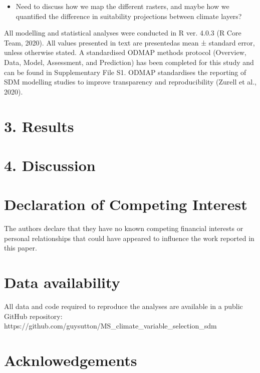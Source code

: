 \documentclass[
  authoryear,
  preprint,
  3p,
  twocolumn]{elsarticle}
\providecommand{\tightlist}{%
  \setlength{\itemsep}{0pt}\setlength{\parskip}{0pt}}\usepackage{longtable,booktabs,array}
\begin{document}
\begin{itemize}
\tightlist
\item
  Need to discuss how we map the different rasters, and maybe how we
  quantified the difference in suitability projections between climate
  layers?
\end{itemize}

All modelling and statistical analyses were conducted in R ver. 4.0.3 (R
Core Team, 2020). All values presented in text are presentedas mean ±
standard error, unless otherwise stated. A standardised ODMAP methods
protocol (Overview, Data, Model, Assessment, and Prediction) has been
completed for this study and can be found in Supplementary File S1.
ODMAP standardises the reporting of SDM modelling studies to improve
transparency and reproducibility (Zurell et al., 2020).

\hypertarget{results}{%
\section{3. Results}\label{results}}

\hypertarget{discussion}{%
\section{4. Discussion}\label{discussion}}

\hypertarget{declaration-of-competing-interest}{%
\section{Declaration of Competing
Interest}\label{declaration-of-competing-interest}}

The authors declare that they have no known competing financial
interests or personal relationships that could have appeared to
influence the work reported in this paper.

\hypertarget{data-availability}{%
\section{Data availability}\label{data-availability}}

All data and code required to reproduce the analyses are available in a
public GitHub repository:
https://github.com/guysutton/MS\_climate\_variable\_selection\_sdm

\hypertarget{acknlowedgements}{%
\section{Acknlowedgements}\label{acknlowedgements}}
\end{document}
